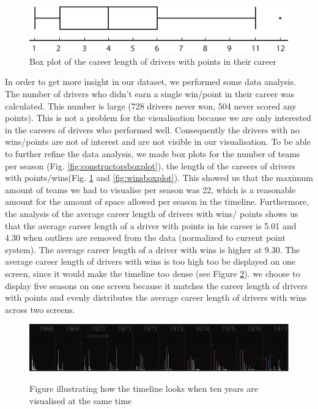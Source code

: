 \documentclass{sigchi}
\begin{document}
\begin{figure}[ht]
\centering
\includegraphics[width=0.8\columnwidth]{images/pointsboxplot.pdf}
\caption{Box plot of the career length of drivers with points in their career}
\label{fig:pointsboxplot}
\end{figure}
In order to get 
more insight in our dataset, we performed some data analysis. The number of drivers who didn’t earn a single win/point in their career was calculated. This number is large (728 drivers never won, 504 never scored any points). This is not a problem for the visualisation because we are only interested in the careers of drivers who performed well. Consequently the drivers with no wins/points are not of interest and are not visible in our visualisation. To be able to further refine the data analysis, we made box plots for the number of teams per season (Fig. \ref{fig:constructorsboxplot}), the length of the careers of drivers with points/wins(Fig. \ref{fig:pointsboxplot} and \ref{fig:winsboxplot}). This showed us that the maximum amount of teams we had to visualise per season was 22, which is a reasonable amount for the amount of space allowed per season in the timeline. Furthermore, the analysis of the average career length of drivers with wins/ points shows us that the average career length of a driver with points in his career is 5.01 and 4.30 when outliers are removed from the data (normalized to current point system). The average career length of a driver with wins is higher at 9.30. The average career length of drivers with wins is too high too be displayed on one screen, since it would make the timeline too dense (see Figure \ref{fig:numYears}). we choose to display five seasons on one screen because it matches the career length of drivers with points and evenly distributes the average career length of drivers with wins across two screens.

\begin{figure}[ht]
\centering
\includegraphics[width=1\columnwidth]{images/dense.PNG}
\label{fig:numYears}
\caption{Figure illustrating how the timeline looks when ten years are visualised at the same time}
\end{figure}
\end{document}
